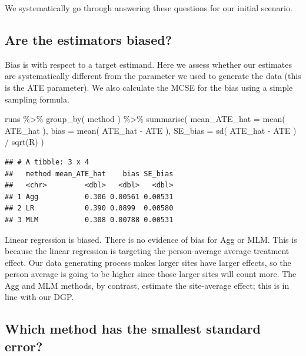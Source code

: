 \documentclass[
]{book}
\newenvironment{Shaded}{\begin{snugshade}}{\end{snugshade}}
\newcommand{\AttributeTok}[1]{\textcolor[rgb]{0.77,0.63,0.00}{#1}}
\newcommand{\FunctionTok}[1]{\textcolor[rgb]{0.00,0.00,0.00}{#1}}
\newcommand{\NormalTok}[1]{#1}
\newcommand{\SpecialCharTok}[1]{\textcolor[rgb]{0.00,0.00,0.00}{#1}}
\begin{document}
We systematically go through answering these questions for our initial scenario.

\hypertarget{are-the-estimators-biased}{%
\subsection{Are the estimators biased?}\label{are-the-estimators-biased}}

Bias is with respect to a target estimand.
Here we assess whether our estimates are systematically different from the parameter we used to generate the data (this is the ATE parameter).
We also calculate the MCSE for the bias using a simple sampling formula.

\begin{Shaded}
\begin{Highlighting}[]
\NormalTok{runs }\SpecialCharTok{\%\textgreater{}\%} 
  \FunctionTok{group\_by}\NormalTok{( method ) }\SpecialCharTok{\%\textgreater{}\%}
  \FunctionTok{summarise}\NormalTok{( }
    \AttributeTok{mean\_ATE\_hat =} \FunctionTok{mean}\NormalTok{( ATE\_hat ),}
    \AttributeTok{bias =} \FunctionTok{mean}\NormalTok{( ATE\_hat }\SpecialCharTok{{-}}\NormalTok{ ATE ),}
    \AttributeTok{SE\_bias =} \FunctionTok{sd}\NormalTok{( ATE\_hat }\SpecialCharTok{{-}}\NormalTok{ ATE ) }\SpecialCharTok{/} \FunctionTok{sqrt}\NormalTok{(R)}
\NormalTok{  )}
\end{Highlighting}
\end{Shaded}

\begin{verbatim}
## # A tibble: 3 x 4
##   method mean_ATE_hat    bias SE_bias
##   <chr>         <dbl>   <dbl>   <dbl>
## 1 Agg           0.306 0.00561 0.00531
## 2 LR            0.390 0.0899  0.00580
## 3 MLM           0.308 0.00788 0.00531
\end{verbatim}

Linear regression is biased. There is no evidence of bias for Agg or MLM.
This is because the linear regression is targeting the person-average average treatment effect.
Our data generating process makes larger sites have larger effects, so the person average is going to be higher since those larger sites will count more.
The Agg and MLM methods, by contrast, estimate the site-average effect; this is in line with our DGP.

\hypertarget{which-method-has-the-smallest-standard-error}{%
\subsection{Which method has the smallest standard error?}\label{which-method-has-the-smallest-standard-error}}
\end{document}
